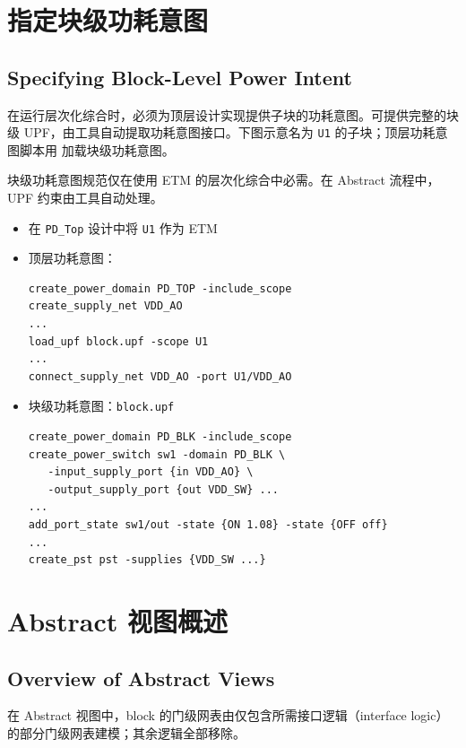 \section{指定块级功耗意图}
\subsection*{Specifying Block-Level Power Intent}

在运行层次化综合时，必须为顶层设计实现提供子块的功耗意图。可提供完整的块级 UPF，由工具自动提取功耗意图接口。下图示意名为 \texttt{U1} 的子块；顶层功耗意图脚本用  加载块级功耗意图。

\begin{noteBox}
块级功耗意图规范仅在使用 ETM 的层次化综合中必需。在 Abstract 流程中，UPF 约束由工具自动处理。
\end{noteBox}

\begin{itemize}
  \item 在 \texttt{PD\_Top} 设计中将 \texttt{U1} 作为 ETM
  \item 顶层功耗意图：
\begin{lstlisting}
create_power_domain PD_TOP -include_scope
create_supply_net VDD_AO
...
load_upf block.upf -scope U1
...
connect_supply_net VDD_AO -port U1/VDD_AO
\end{lstlisting}
  \item 块级功耗意图：\texttt{block.upf}
\begin{lstlisting}
create_power_domain PD_BLK -include_scope
create_power_switch sw1 -domain PD_BLK \
   -input_supply_port {in VDD_AO} \
   -output_supply_port {out VDD_SW} ...
...
add_port_state sw1/out -state {ON 1.08} -state {OFF off}
...
create_pst pst -supplies {VDD_SW ...}
\end{lstlisting}
\end{itemize}

\section{Abstract 视图概述}
\subsection*{Overview of Abstract Views}

在 Abstract 视图中，block 的门级网表由仅包含所需接口逻辑（interface logic）的部分门级网表建模；其余逻辑全部移除。

